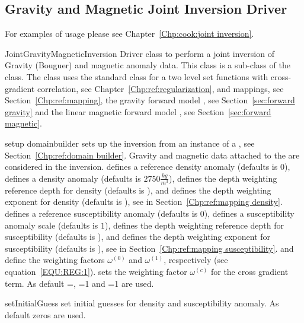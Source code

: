\subsection{Gravity and Magnetic Joint Inversion Driver}
For examples of usage please see Chapter~\ref{Chp:cook:joint inversion}.

\begin{classdesc}{JointGravityMagneticInversion}{}
Driver class to perform a joint inversion of  Gravity (Bouguer) and magnetic anomaly data. This class
is a sub-class of the  class. 
The class uses the standard
 class for a two level set functions with cross-gradient correlation, see Chapter~\ref{Chp:ref:regularization},
 and  mappings, see Section~\ref{Chp:ref:mapping}, the 
gravity forward model , see Section~\ref{sec:forward gravity}
and the linear
magnetic forward model , see Section~\ref{sec:forward magnetic}.
\end{classdesc}


\begin{methoddesc}[JointGravityMagneticInversion]{setup}{
domainbuilder
}
sets up the inversion from an instance  of a , see Section~\ref{Chp:ref:domain builder}.
Gravity and magnetic data attached to the  are considered in the inversion.
 defines a reference density anomaly (defaults is 0), 
 defines a density anomaly (defaults is $2750 \frac{kg}{m^3}$),
 defines the depth weighting reference depth for density (defaults is \None), and
 defines the depth weighting exponent for density (defaults is \None),
see  in Section~\ref{Chp:ref:mapping density}.
 defines a reference susceptibility anomaly (defaults is 0), 
 defines a susceptibility anomaly scale (defaults is $1$),
 defines the depth weighting reference depth for susceptibility (defaults is \None), and
 defines the depth weighting exponent for susceptibility (defaults is \None),
see  in Section~\ref{Chp:ref:mapping susceptibility}.
 and  define the weighting factors
$\omega^{(0)}$ and
$\omega^{(1)}$, respectively (see equation~\ref{EQU:REG:1}). 
 sets the weighting factor $\omega^{(c)}$ for the cross gradient term. 
As default =\None, =1 and =1 are used.
\end{methoddesc}

\begin{methoddesc}[JointGravityMagneticInversion]{setInitialGuess}{ }
set initial guesses for density and susceptibility anomaly. As default zeros are used.
\end{methoddesc}



